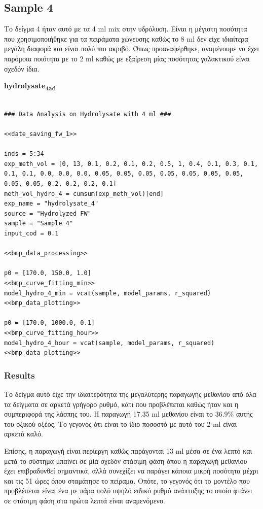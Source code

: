 \documentclass[11pt]{article}
\begin{document}
\subsection{Sample 4}
\label{sec:org763ae12}
Το δείγμα 4 ήταν αυτό με τα 4 ml mix στην υδρόλυση. Είναι η μέγιστη ποσότητα που χρησιμοποιήθηκε για τα πειράματα χώνευσης καθώς το 8 ml δεν είχε ιδιαίτερα μεγάλη διαφορά και είναι πολύ πιο ακριβό. Όπως προαναφέρθηκε, αναμένουμε να έχει παρόμοια ποιότητα με το 2 ml καθώς με εξαίρεση μίας ποσότητας γαλακτικού είναι σχεδόν ίδια.

\textbf{hydrolysate\textsubscript{4}\textsubscript{ad}}
\begin{verbatim}

### Data Analysis on Hydrolysate with 4 ml ###

<<date_saving_fw_1>>

inds = 5:34
exp_meth_vol = [0, 13, 0.1, 0.2, 0.1, 0.2, 0.5, 1, 0.4, 0.1, 0.3, 0.1, 0.1, 0.1, 0.0, 0.0, 0.0, 0.05, 0.05, 0.05, 0.05, 0.05, 0.05, 0.05, 0.05, 0.05, 0.2, 0.2, 0.2, 0.1]
meth_vol_hydro_4 = cumsum(exp_meth_vol)[end]
exp_name = "hydrolysate_4"
source = "Hydrolyzed FW"
sample = "Sample 4"
input_cod = 0.1

<<bmp_data_processing>>

p0 = [170.0, 150.0, 1.0]
<<bmp_curve_fitting_min>>
model_hydro_4_min = vcat(sample, model_params, r_squared)
<<bmp_data_plotting>>

p0 = [170.0, 1000.0, 0.1]
<<bmp_curve_fitting_hour>>
model_hydro_4_hour = vcat(sample, model_params, r_squared)
<<bmp_data_plotting>>
\end{verbatim}

\subsubsection{Results}
\label{sec:org742fe2d}
Το δείγμα αυτό είχε την ιδιαιτερότητα της μεγαλύτερης παραγωγής μεθανίου από όλα τα δείγματα σε αρκετά γρήγορο ρυθμό, κάτι που προβλέπεται καθώς ήταν και η συμπεριφορά της λάσπης του. Η παραγωγή 17.35 ml μεθανίου είναι το \(36.9 \%\) αυτής του οξικού οξέος. Το γεγονός ότι είναι το ίδιο ποσοστό με αυτό του 2 ml είναι αρκετά καλό.

Επίσης, η παραγωγή είναι περίεργη καθώς παράγονται 13 ml μέσα σε ένα λεπτό και μετά το σύστημα μπαίνει σε μία σχεδόν στάσιμη φάση όπου η παραγωγή μεθανίου έχει επιβραδυνθεί σημαντικά, αλλά συνεχίζει να παράγει κάποια μικρή ποσότητα μέχρι και τις 51 ώρες όπου σταμάτησε το πείραμα. Οπότε, το γεγονός ότι το μοντέλο που προβλέπεται είναι ένα με πάρα πολύ υψηλό ειδικό ρυθμό ανάπτυξης το οποίο φτάνει σε στάσιμη φάση στα πρώτα λεπτά είναι αναμενόμενο.
\end{document}
